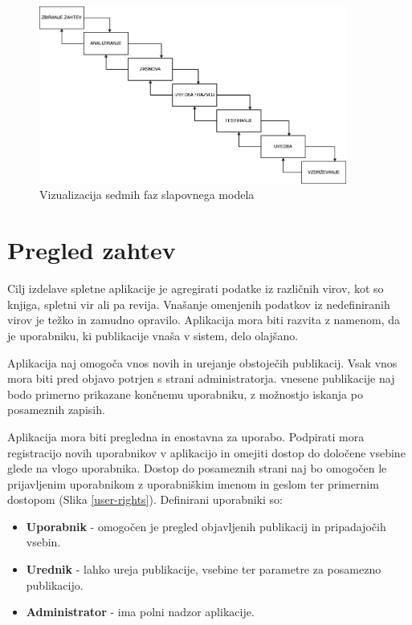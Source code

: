 \documentclass[a4paper, 12pt]{book}
\begin{document}
\begin{figure}[h]
\begin{center}
\includegraphics[width=0.9\textwidth]{slike/waterfall.png}
\end{center}
\caption{ Vizualizacija sedmih faz slapovnega modela }
\label{waterfall-phases}
\end{figure}

\section{Pregled zahtev}
Cilj izdelave spletne aplikacije je agregirati podatke iz različnih virov, kot so knjiga, spletni vir ali pa revija. Vnašanje omenjenih podatkov iz nedefiniranih virov je težko in zamudno opravilo. Aplikacija mora biti razvita z namenom, da je uporabniku, ki publikacije vnaša v sistem, delo olajšano. 

Aplikacija naj omogoča vnos novih in urejanje obstoječih publikacij. Vsak vnos mora biti pred objavo potrjen s strani administratorja. vnesene publikacije naj bodo primerno prikazane končnemu uporabniku, z možnostjo iskanja po posameznih zapisih. 


Aplikacija mora biti pregledna in enostavna za uporabo. Podpirati mora registracijo novih uporabnikov v aplikacijo in omejiti dostop do določene vsebine glede na vlogo uporabnika. Dostop do posameznih strani naj bo omogočen le prijavljenim uporabnikom z uporabniškim imenom in geslom ter primernim dostopom (Slika \ref{user-rights}). Definirani uporabniki so: 
\begin{itemize}
    \item \textbf{Uporabnik} - omogočen je pregled objavljenih publikacij in pripadajočih vsebin.
	\item \textbf{Urednik} - lahko ureja publikacije, vsebine ter parametre za posamezno publikacijo.
	\item \textbf{Administrator} - ima polni nadzor aplikacije.
\end{itemize}
\end{document}
